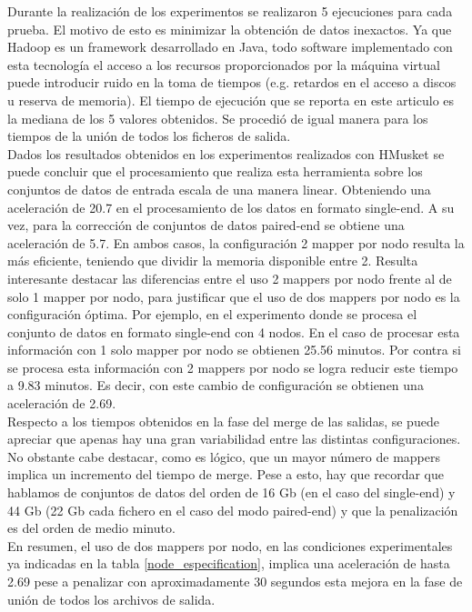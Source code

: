 \documentclass[conference]{IEEEtran}
\begin{document}
Durante la realización de los experimentos se realizaron 5 ejecuciones para cada prueba. El motivo de esto es minimizar la obtención de datos inexactos. Ya que Hadoop es un framework desarrollado en Java, todo software implementado con esta tecnología el acceso a los recursos proporcionados por la máquina virtual puede introducir ruido en la toma de tiempos (e.g. retardos en el acceso a discos u reserva de memoria). El tiempo de ejecución que se reporta en este articulo es la mediana de los 5 valores obtenidos. Se procedió de igual manera para los tiempos de la unión de todos los ficheros de salida.\\

Dados los resultados obtenidos en los experimentos realizados con HMusket se puede concluir que el procesamiento que realiza esta herramienta sobre los conjuntos de datos de entrada escala de una manera linear. Obteniendo una aceleración de 20.7 en el procesamiento de los datos en formato single-end. A su vez, para la corrección de conjuntos de datos paired-end se obtiene una aceleración de 5.7. En ambos casos, la configuración 2 mapper por nodo resulta la más eficiente, teniendo que dividir la memoria disponible entre 2. Resulta interesante destacar las diferencias entre el uso 2 mappers por nodo frente al de solo 1 mapper por nodo, para justificar que el uso de dos mappers por nodo es la configuración óptima. Por ejemplo, en el experimento donde se procesa el conjunto de datos en formato single-end con 4 nodos. En el caso de procesar esta información con 1 solo mapper por nodo se obtienen 25.56 minutos. Por contra si se procesa esta información con 2 mappers por nodo se logra reducir este tiempo a  9.83 minutos. Es decir, con este cambio de configuración se obtienen una aceleración de 2.69.\\

Respecto a los tiempos obtenidos en la fase del merge de las salidas, se puede apreciar que apenas hay una gran variabilidad entre las distintas configuraciones. No obstante cabe destacar, como es lógico, que un mayor número de mappers implica un incremento del tiempo de merge. Pese a esto, hay que recordar que hablamos de conjuntos de datos del orden de 16 Gb (en el caso del single-end) y 44 Gb (22 Gb cada fichero en el caso del modo paired-end) y que la penalización es del orden de medio minuto.\\

En resumen, el uso de dos mappers por nodo, en las condiciones experimentales ya indicadas en la tabla \ref{node_especification}, implica una aceleración de hasta 2.69 pese a penalizar con aproximadamente 30 segundos esta mejora en la fase de unión de todos los archivos de salida.\\
\end{document}
